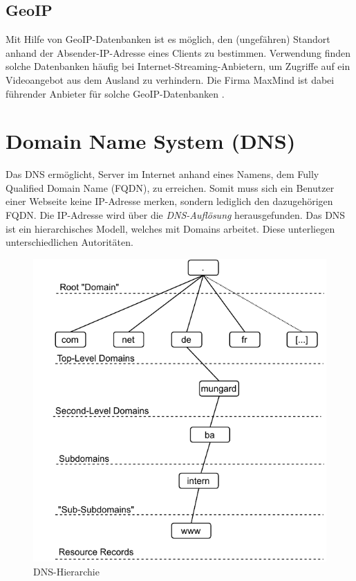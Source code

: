 \subsection{GeoIP}
Mit Hilfe von \gls{GeoIP}-Datenbanken ist es möglich, den (ungefähren) Standort anhand der Absender-IP-Adresse eines \gls{Client}s zu bestimmen. Verwendung finden solche Datenbanken häufig bei Internet-Streaming-Anbietern, um Zugriffe auf ein Videoangebot aus dem Ausland zu verhindern. Die Firma MaxMind ist dabei führender Anbieter für solche \gls{GeoIP}-Datenbanken \cite{maxmind2021geoip}.

\section{Domain Name System (DNS)}\label{DNS}
Das \gls{DNS} ermöglicht, Server im Internet anhand eines Namens, dem Fully Qualified Domain Name (\gls{FQDN}), zu erreichen. Somit muss sich ein Benutzer einer Webseite keine IP-Adresse merken, sondern lediglich den dazugehörigen \gls{FQDN}. Die IP-Adresse wird über die \textit{DNS-Auflösung} herausgefunden. Das \gls{DNS} ist ein hierarchisches Modell, welches mit Domains arbeitet. Diese unterliegen unterschiedlichen Autoritäten. 
\begin{figure}[h]
  \centering
  \includegraphics{Figures/dns_autoritative.pdf}
  \caption{DNS-Hierarchie}
  \label{grafik: dns-hierarchy}
\end{figure}\FloatBarrier

